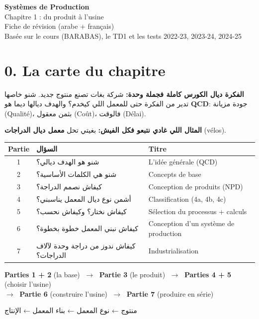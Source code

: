 \documentclass[11pt,a4paper]{article}
\newcommand{\ar}[1]{\textarabic{#1}}
\newcommand{\fr}[1]{\textfrench{#1}}
\begin{document}
\begin{center}
{\LARGE\bfseries Systèmes de Production}\\[4pt]
{\Large Chapitre 1 : du produit à l'usine}\\[4pt]
{\large Fiche de révision (arabe + français)}\\[2pt]
{\small Basée sur le cours (BARABAS), le TD1 et les tests 2022-23, 2023-24, 2024-25}
\end{center}

\section*{0. La carte du chapitre}

\par\begin{Arabic}
\textbf{الفكرة ديال الكورس كاملة فجملة وحدة:}
شركة بغات تصنع منتوج جديد. شنو خاصها تدير من الفكرة حتى للمعمل اللي كيخدم؟
والهدف ديالها ديما هو \textbf{\fr{QCD}}: جودة مزيانة (\fr{Qualité})، بثمن معقول (\fr{Coût})، فالوقت (\fr{Délai}).

\textbf{المثال اللي غادي نتبعو فكل الفيش:} بغيتي تحل \textbf{معمل ديال الدراجات} (\fr{vélos}).
\end{Arabic}

\begin{center}
\begin{tabularx}{\linewidth}{c >{\raggedleft\arraybackslash}X l}
\toprule
\textbf{Partie} & \ar{\textbf{السؤال}} & \textbf{Titre} \\
\midrule
1 & \ar{شنو هو الهدف ديالي؟} & L'idée générale (QCD) \\
2 & \ar{شنو هي الكلمات الأساسية؟} & Concepts de base \\
3 & \ar{كيفاش نصمم الدراجة؟} & Conception de produits (NPD) \\
4 & \ar{أشمن نوع ديال المعمل يناسبني؟} & Classification (4a, 4b, 4c) \\
5 & \ar{كيفاش نختار؟ وكيفاش نحسب؟} & Sélection du processus + calculs \\
6 & \ar{كيفاش نبني المعمل خطوة بخطوة؟} & Conception d'un système de production \\
7 & \ar{كيفاش ندوز من دراجة وحدة لآلاف الدراجات؟} & Industrialisation \\
\bottomrule
\end{tabularx}
\end{center}

\begin{tcolorbox}[colback=bleu!4,colframe=bleu,title=La chaîne logique du chapitre,fonttitle=\bfseries]
\centering
\textbf{Parties 1 + 2} (la base) $\;\longrightarrow\;$ \textbf{Partie 3} (le produit) $\;\longrightarrow\;$ \textbf{Parties 4 + 5} (choisir l'usine)\\[3pt]
$\longrightarrow\;$ \textbf{Partie 6} (construire l'usine) $\;\longrightarrow\;$ \textbf{Partie 7} (produire en série)
\par\begin{Arabic}
\centering
منتوج ← نوع المعمل ← بناء المعمل ← الإنتاج
\end{Arabic}
\end{tcolorbox}
\end{document}
